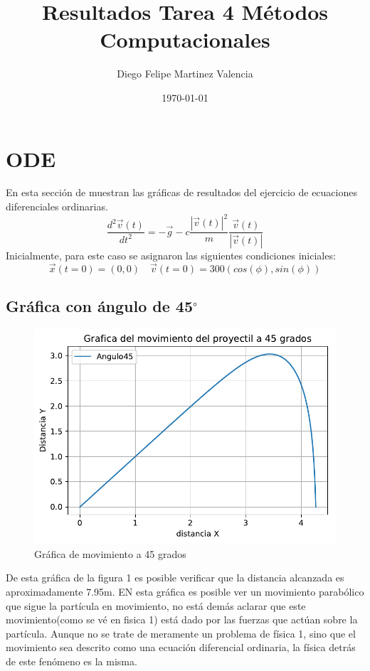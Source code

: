 \documentclass{report}
\title{Resultados Tarea 4 Métodos Computacionales }
\author{Diego Felipe  Martinez Valencia}
\date{\today}
\begin{document}
\maketitle{}
\vspace*{-1cm}
\justify 
\section*{ODE}
En esta sección de muestran las gráficas de resultados del ejercicio de ecuaciones diferenciales ordinarias.
\begin{equation}
    \frac{d^{2}\vec{v}(t)}{dt^{2}}=-\vec{g}-c\frac{|\vec{v}(t)|^{2}}{m}\frac{\vec{v}(t)}{|\vec{v}(t)|}
\end{equation}
Inicialmente, para este caso se asignaron las siguientes condiciones iniciales:
\begin{equation}
    \vec{x}(t=0)=(0,0) \quad \vec{v}(t=0)=300(cos(\phi),sin(\phi))
\end{equation}
\subsection{Gráfica con ángulo de 45$^\circ$}
\begin{figure}[h]
    \centering
    \includegraphics[scale = 0.5]{ODE_45grados.pdf}
    \caption{Gráfica de movimiento a 45 grados}
    \label{fig:my_label}
\end{figure}
De esta gráfica de la figura 1 es posible verificar que la distancia alcanzada es aproximadamente 7.95m. EN esta gráfica es posible ver un movimiento parabólico que sigue la partícula en movimiento, no está demás aclarar que este movimiento(como se vé en fisica 1) está dado por las fuerzas que actúan sobre la partícula. Aunque no se trate de meramente un problema de física 1, sino que el movimiento sea descrito como una ecuación diferencial ordinaria, la física detrás de este fenómeno es la misma.
\end{document}
